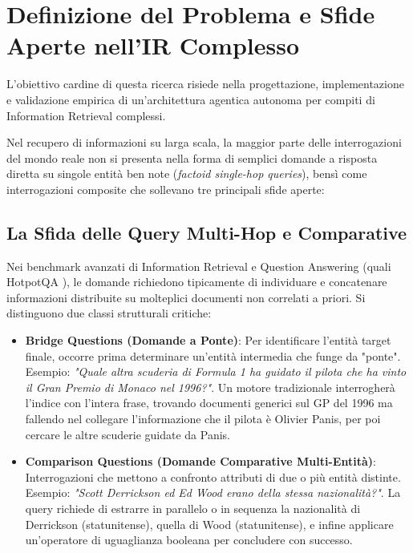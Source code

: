 \section{Definizione del Problema e Sfide Aperte nell'IR Complesso}
\label{sec:definizione_problema}

L'obiettivo cardine di questa ricerca risiede nella progettazione, implementazione e validazione empirica di un'architettura agentica autonoma per compiti di Information Retrieval complessi.

Nel recupero di informazioni su larga scala, la maggior parte delle interrogazioni del mondo reale non si presenta nella forma di semplici domande a risposta diretta su singole entità ben note (\textit{factoid single-hop queries}), bensì come interrogazioni composite che sollevano tre principali sfide aperte:

\subsection{La Sfida delle Query Multi-Hop e Comparative}
Nei benchmark avanzati di Information Retrieval e Question Answering (quali HotpotQA \cite{yang2018hotpotqa}), le domande richiedono tipicamente di individuare e concatenare informazioni distribuite su molteplici documenti non correlati a priori. Si distinguono due classi strutturali critiche:
\begin{itemize}
    \item \textbf{Bridge Questions (Domande a Ponte)}: Per identificare l'entità target finale, occorre prima determinare un'entità intermedia che funge da "ponte". Esempio: \textit{"Quale altra scuderia di Formula 1 ha guidato il pilota che ha vinto il Gran Premio di Monaco nel 1996?"}. Un motore tradizionale interrogherà l'indice con l'intera frase, trovando documenti generici sul GP del 1996 ma fallendo nel collegare l'informazione che il pilota è Olivier Panis, per poi cercare le altre scuderie guidate da Panis.
    \item \textbf{Comparison Questions (Domande Comparative Multi-Entità)}: Interrogazioni che mettono a confronto attributi di due o più entità distinte. Esempio: \textit{"Scott Derrickson ed Ed Wood erano della stessa nazionalità?"}. La query richiede di estrarre in parallelo o in sequenza la nazionalità di Derrickson (statunitense), quella di Wood (statunitense), e infine applicare un'operatore di uguaglianza booleana per concludere con successo.
\end{itemize}

